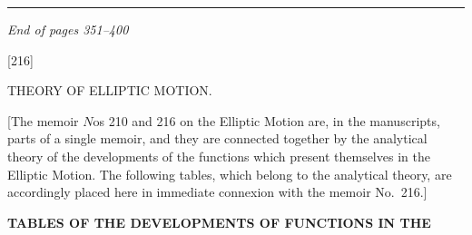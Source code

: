 \documentclass[11pt,a4paper]{book}
\begin{document}
\vspace{2em}

\begin{center}
\rule{0.5\textwidth}{0.4pt}

\textit{End of pages 351--400}
\end{center}
\clearpage


\begin{center}
\Large[216]

\vspace{0.5em}
\Large THEORY OF ELLIPTIC MOTION.
\end{center}

\vspace{1em}

\noindent
{\small [The memoir \(N\)os 210 and 216 on the Elliptic Motion are, in the manuscripts, parts of a single memoir, and they are connected together by the analytical theory of the developments of the functions which present themselves in the Elliptic Motion.  The following tables, which belong to the analytical theory, are accordingly placed here in immediate connexion with the memoir No.\ 216.]}

\vspace{1em}

\begin{center}
\textbf{\large TABLES OF THE DEVELOPMENTS OF FUNCTIONS IN THE}
\end{center}

\vspace{0.5em}

\end{document}
